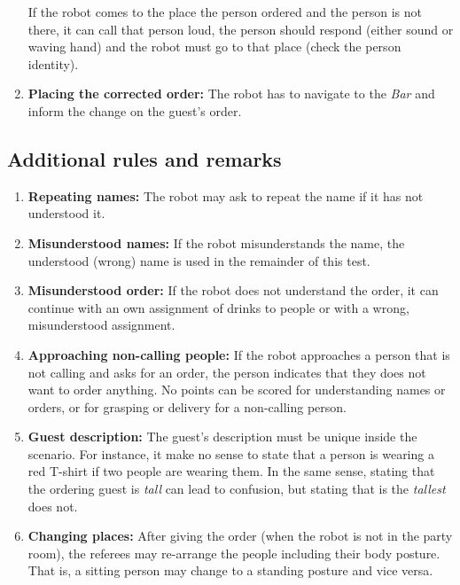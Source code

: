 \begin{enumerate}
	If the robot comes to the place the person ordered and the person is not there, it can call that person loud, the person should respond (either sound or waving hand) and the robot must go to that place (check the person identity).

	\item \textbf{Placing the corrected order:} The robot has to navigate to the \textit{Bar} and inform the change on the guest's order.
\end{enumerate}

\subsection{Additional rules and remarks}
\begin{enumerate}
	\item \textbf{Repeating names:} The robot may ask to repeat the name if it has not understood it.

	\item \textbf{Misunderstood names:} If the robot misunderstands the name, the understood (wrong) name is used in the remainder of this test.

	\item \textbf{Misunderstood order:} If the robot does not understand the order, it can continue with an own assignment of drinks to people or with a wrong, misunderstood assignment.

	\item \textbf{Approaching non-calling people:} If the robot approaches a person that is not calling and asks for an order, the person indicates that they does not want to order anything. No points can be scored for understanding names or orders, or for grasping or delivery for a non-calling person.

	\item \textbf{Guest description:} The guest's description must be unique inside the scenario. For instance, it make no sense to state that a person is wearing a red T-shirt if two people are wearing them. In the same sense, stating that the ordering guest is \textit{tall} can lead to confusion, but stating that is the \textit{tallest} does not.

	\item \textbf{Changing places:} After giving the order (when the robot is not in the party room), the referees may re-arrange the people including their body posture. That is, a sitting person may change to a standing posture and vice versa.


\end{enumerate}

